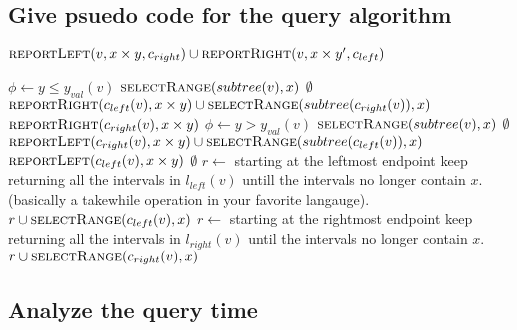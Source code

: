 \documentclass{article}
\begin{document}
\subsection{Give psuedo code for the query algorithm}
\begin{algorithmic}[1]
			\State
			\Return {}
		\EndIf
		\State
		\Return {}
		\EndIf
		\State
		\Return {}
		\EndIf
		\State
		\State
		\Return $\Call{reportLeft}{v, x\times y, c_{right}}\cup
		\Call{reportRight}{v,x\times y', c_{left}}$
	\EndFunction
\end{algorithmic}
\newpage
\begin{algorithmic}[1]
		\State
		$\phi \gets y \leq y_{val}(v)$
			\If{$\phi$}
				\State
				\Return $\Call{selectRange}{subtree(v),x}$
			\EndIf
			\State
			\Return $\emptyset$
		\EndIf
		\If{$\phi$}
		\State
		\Return $\Call{reportRight}{c_{left}(v), x \times y} \cup
		\Call{selectRange}{subtree(c_{right}(v)),x}$
		\EndIf
		\State
		\Return $\Call{reportRight}{c_{right}(v), x \times y}$
	\EndFunction
		\State
		$\phi \gets y > y_{val}(v)$
			\If{$\phi$}
				\State
				\Return $\Call{selectRange}{subtree(v),x}$
			\EndIf
			\State
			\Return $\emptyset$
		\EndIf
		\If{$\phi$}
		\State
		\Return $\Call{reportLeft}{c_{right}(v), x \times y} \cup
		\Call{selectRange}{subtree(c_{left}(v)),x}$
		\EndIf
		\State
		\Return $\Call{reportLeft}{c_{left}(v), x \times y}$
	\EndFunction
		\State
		\Return $\emptyset$
	\EndIf
		\State
		$r \gets $ starting at the leftmost endpoint keep
		returning all the intervals in $l_{left}(v)$ untill the
		intervals no longer contain $x$. (basically a takewhile
		operation in your favorite langauge).
		\State
		\Return $r \cup \Call{selectRange}{c_{left}(v),x}$
	\EndIf
	\State
	$r \gets $ starting at the rightmost endpoint keep
	returning all the intervals in $l_{right}(v)$ until the
	intervals no longer contain $x$.
	\State
	\Return $r \cup \Call{selectRange}{c_{right}(v),x}$
	\EndFunction
\end{algorithmic}
\subsection{Analyze the query time}
\end{document}
